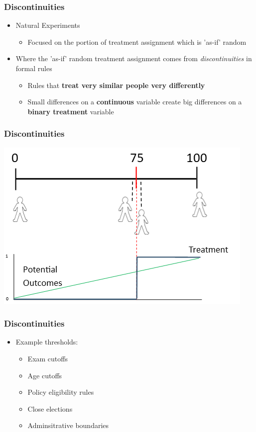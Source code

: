 \documentclass[xcolor=x11names,compress]{beamer}\usepackage[]{graphicx}\usepackage[]{color}
\renewcommand{\(}{\begin{columns}}
\renewcommand{\)}{\end{columns}}
\newcommand{\<}[1]{\begin{column}{#1}}
\renewcommand{\>}{\end{column}}
\begin{document}
\begin{frame}
\frametitle{Discontinuities}
\begin{itemize}
\item Natural Experiments
\begin{itemize}
\item Focused on the portion of treatment assignment which is 'as-if' random
\end{itemize}
\pause
\item Where the 'as-if' random treatment assignment comes from \textit{discontinuities} in formal rules
\pause
\begin{itemize}
\item Rules that \textbf{treat very similar people very differently}
\pause
\item Small differences on a \textbf{continuous} variable create big differences on a \textbf{binary treatment} variable
\end{itemize}
\end{itemize}
\end{frame}

\begin{frame}
\frametitle{Discontinuities}
\begin{center}
\includegraphics[scale=0.55]{Scale.png}
\end{center}
\end{frame}


\begin{frame}
\frametitle{Discontinuities}
\begin{itemize}
\item Example thresholds:
\begin{itemize}
\item Exam cutoffs
\item Age cutoffs
\item Policy eligibility rules
\item Close elections
\item Adminsitrative boundaries
\end{itemize}
\end{itemize}
\end{frame}
\end{document}

